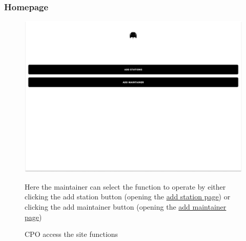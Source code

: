 \subsubsection{Homepage}
\begin{figure}[H]
    \centering
    \includegraphics[keepaspectratio, width=15cm]{Mockup/CPMSSiteInterface/Homepage.png}
    \caption{\ac{CPO} access the site functions}
    \label{cpo:Homepage}
    Here the maintainer can select the function to operate by either clicking the add station button (opening the \hyperref[cpo:Station]{add station page}) or clicking the add maintainer button (opening the \hyperref[cpo:Maintainer]{add maintainer page})
\end{figure}

